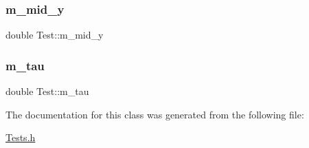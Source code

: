 \mbox{\label{classTest_ac5320245177183e915499a6fa24fa78f}} 
\subsubsection{\texorpdfstring{m\+\_\+mid\+\_\+y}{m\_mid\_y}}
{\footnotesize\ttfamily double Test\+::m\+\_\+mid\+\_\+y\hspace{0.3cm}{\ttfamily [protected]}}

\mbox{\label{classTest_a4188a6948254ce4b0fb56707b8e5e928}} 
\subsubsection{\texorpdfstring{m\+\_\+tau}{m\_tau}}
{\footnotesize\ttfamily double Test\+::m\+\_\+tau\hspace{0.3cm}{\ttfamily [protected]}}



The documentation for this class was generated from the following file\+:\begin{DoxyCompactItemize}
\item 
\hyperlink{Tests_8h}{Tests.\+h}\end{DoxyCompactItemize}
